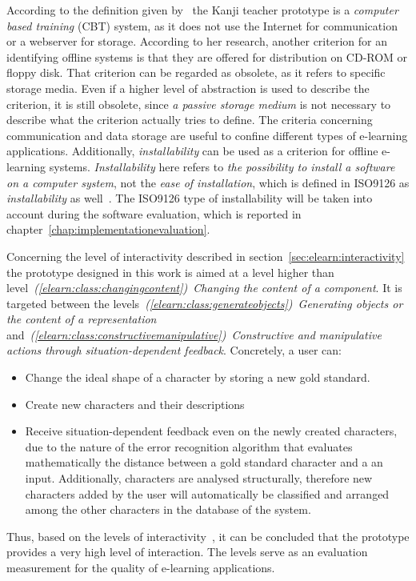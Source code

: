 According to the definition given by~ the Kanji teacher 
prototype is a \emph{computer based training} (CBT) system, as it does not use 
the Internet for communication or a webserver for storage. 
According to her research, another criterion for an identifying offline systems 
is that they are offered for distribution on CD-ROM or floppy disk.
That criterion can be regarded as obsolete, as it refers to specific storage 
media. Even if a higher level of abstraction is used to describe the
criterion, it is still obsolete, since \emph{a passive storage medium} is not 
necessary to describe what the criterion actually tries to define.
The criteria concerning communication and data storage are useful to confine
different types of e-learning applications.
Additionally, \emph{installability} can be used as a criterion for offline 
e-learning systems. \emph{Installability} here refers to 
\emph{the possibility to install a software on a computer system}, 
not the \emph{ease of installation}, 
which is defined in ISO9126 as \emph{installability} as 
well~. 
The ISO9126 type of installability will be taken into account during the software
evaluation, which is reported in chapter~\ref{chap:implementationevaluation}.

Concerning the level of interactivity described in 
section~\ref{sec:elearn:interactivity} the prototype designed in this work is 
aimed at a level higher than 
level~\emph{(\ref{elearn:class:changingcontent})~Changing the content of a 
component}. It is targeted between the 
levels~\emph{(\ref{elearn:class:generateobjects})~Generating objects or 
the content of a representation} 
and~\emph{(\ref{elearn:class:constructivemanipulative})~Constructive and 
manipulative actions through situation-dependent feedback}.
Concretely, a user can:
\begin{itemize}
 \item Change the ideal shape of a character by storing a new gold standard.
 \item Create new characters and their descriptions
 \item Receive situation-dependent feedback even on the newly created characters,
       due to the nature of the error recognition algorithm that evaluates
       mathematically the distance between a gold standard character and
       a an input.
       Additionally, characters are analysed structurally, therefore new 
       characters added by the user will automatically be classified and arranged
       among the other characters in the database of the system.
\end{itemize}
Thus, based on the levels of interactivity~,
it can be concluded that the prototype provides a very high level of 
interaction. The levels serve as an evaluation measurement for the quality of 
e-learning applications.

